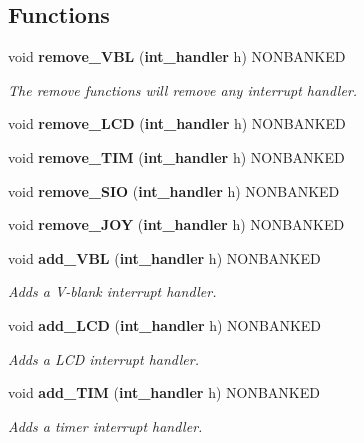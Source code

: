 \subsection*{Functions}
\begin{CompactItemize}
\item 
void {\bf remove\_\-VBL} ({\bf int\_\-handler} h) NONBANKED
\begin{CompactList}\small\item\em The remove functions will remove any interrupt handler.\item\end{CompactList}

\item 
\label{gb.h_a54}
void {\bf remove\_\-LCD} ({\bf int\_\-handler} h) NONBANKED
\item 
\label{gb.h_a55}
void {\bf remove\_\-TIM} ({\bf int\_\-handler} h) NONBANKED
\item 
\label{gb.h_a56}
void {\bf remove\_\-SIO} ({\bf int\_\-handler} h) NONBANKED
\item 
\label{gb.h_a57}
void {\bf remove\_\-JOY} ({\bf int\_\-handler} h) NONBANKED
\item 
void {\bf add\_\-VBL} ({\bf int\_\-handler} h) NONBANKED
\begin{CompactList}\small\item\em Adds a V-blank interrupt handler.\item\end{CompactList}

\item 
void {\bf add\_\-LCD} ({\bf int\_\-handler} h) NONBANKED
\begin{CompactList}\small\item\em Adds a LCD interrupt handler.\item\end{CompactList}

\item 
void {\bf add\_\-TIM} ({\bf int\_\-handler} h) NONBANKED
\begin{CompactList}\small\item\em Adds a timer interrupt handler.\item\end{CompactList}


\end{CompactItemize}

